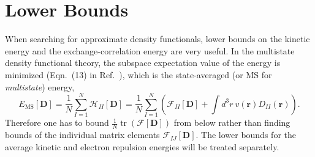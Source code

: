 \documentclass[journal=jpca,manuscript=article,layout=singlecolumn]{achemso}
\DeclareMathOperator{\tr}{tr}
\newcommand\m[1]{\mathbf{#1}}
\renewcommand\vec[1]{\mathbf{#1}}
\begin{document}
\section{Lower Bounds}
\label{sec:lower_bounds}
When searching for approximate density functionals, lower bounds on the kinetic energy and the exchange-correlation energy
are very useful. In the multistate density functional theory, the subspace expectation value of the energy is minimized
(Eqn.~(13) in Ref.~\cite{Lu2022JPCL}), which is the state-averaged (or MS for \emph{multistate}) energy,
\begin{equation}
  E_{\text{MS}}[\m{D}] = \frac{1}{N} \sum_{I=1}^{N} \mathcal{H}_{II}[\m{D}]
  = \frac{1}{N} \sum_{I=1}^{N} \left( \m{\mathcal{F}}_{II}[\m{D}] + \int d^3r ~ v(\vec{r}) D_{II}(\vec{r}) \right).
\end{equation}
Therefore one has to bound $\frac{1}{N} \tr(\m{\mathcal{F}}[\m{D}])$ from below rather than finding bounds of
the individual matrix elements $\mathcal{F}_{IJ}[\m{D}]$. The lower bounds for the average kinetic and electron repulsion energies
will be treated separately.
\end{document}
